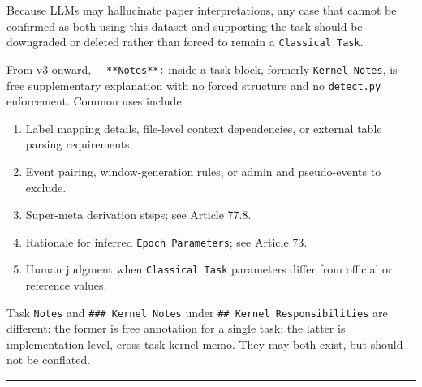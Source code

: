 \begin{tcolorbox}
\smallskip{}\par\smallskip

\noindent Because LLMs may hallucinate paper interpretations, any case that cannot be confirmed as both using this dataset and supporting the task should be downgraded or deleted rather than forced to remain a \texttt{Classical Task}.\par\smallskip

\smallskip{}\par\smallskip

\noindent From v3 onward, \texttt{- **Notes**:} inside a task block, formerly \texttt{Kernel Notes}, is free supplementary explanation with no forced structure and no \texttt{detect.py} enforcement. Common uses include:\par\smallskip

\begin{enumerate}[leftmargin=1.5em,noitemsep,topsep=2pt]
\item Label mapping details, file-level context dependencies, or external table parsing requirements.
\item Event pairing, window-generation rules, or admin and pseudo-events to exclude.
\item Super-meta derivation steps; see Article 77.8.
\item Rationale for inferred \texttt{Epoch Parameters}; see Article 73.
\item Human judgment when \texttt{Classical Task} parameters differ from official or reference values.
\end{enumerate}

\noindent Task \texttt{Notes} and \texttt{\#\#\# Kernel Notes} under \texttt{\#\# Kernel Responsibilities} are different: the former is free annotation for a single task; the latter is implementation-level, cross-task kernel memo. They may both exist, but should not be conflated.\par\smallskip

\medskip{}
\par\nopagebreak\noindent\rule{\linewidth}{0.4pt}\par\smallskip

\smallskip{}\par\smallskip


\end{tcolorbox}

